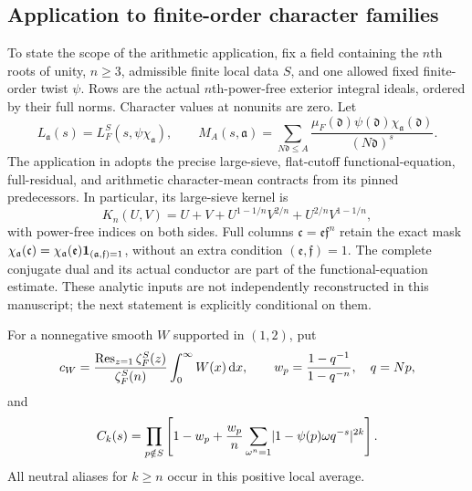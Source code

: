 \subsection{Application to finite-order character families}
To state the scope of the arithmetic application, fix a field containing the $n$th roots of unity, $n\ge3$, admissible finite local data $S$, and one allowed fixed finite-order twist $\psi$. Rows are the actual $n$th-power-free exterior integral ideals, ordered by their full norms. Character values at nonunits are zero. Let
\[
 L_{\mathfrak a}(s)=L_F^S(s,\psi\chi_{\mathfrak a}),\qquad
 M_A(s,\mathfrak a)=\sum_{N\mathfrak d\le A}
 \frac{\mu_F(\mathfrak d)\psi(\mathfrak d)\chi_{\mathfrak a}(\mathfrak d)}{(N\mathfrak d)^s}.
\]
The application in \cite{R989} adopts the precise large-sieve, flat-cutoff functional-equation, full-residual, and arithmetic character-mean contracts from its pinned predecessors. In particular, its large-sieve kernel is
\begin{equation}\label{eq:n-sieve-contract}
 K_n(U,V)=U+V+U^{1-1/n}V^{2/n}+U^{2/n}V^{1-1/n},
\end{equation}
with power-free indices on both sides. Full columns $\mathfrak c=\mathfrak e\mathfrak f^n$ retain the exact mask
$\chi_{\mathfrak a}(\mathfrak c)=\chi_{\mathfrak a}(\mathfrak e)\mathbf 1_{(\mathfrak a,\mathfrak f)=1}$, without an extra condition $(\mathfrak e,\mathfrak f)=1$. The complete conjugate dual and its actual conductor are part of the functional-equation estimate. These analytic inputs are not independently reconstructed in this manuscript; the next statement is explicitly conditional on them.

For a nonnegative smooth $W$ supported in $(1,2)$, put
\[
 c_W=\frac{\operatorname{Res}_{z=1}\zeta_F^S(z)}{\zeta_F^S(n)}\int_0^\infty W(x)\,\mathrm d x,
 \qquad w_p=\frac{1-q^{-1}}{1-q^{-n}},\quad q=Np,
\]
and
\begin{equation}\label{eq:reciprocal-constant}
 C_k(s)=\prod_{p\notin S}\left[
 1-w_p+\frac{w_p}{n}\sum_{\omega^n=1}
               \lvert1-\psi(p)\omega q^{-s}\rvert^{2k}\right].
\end{equation}
All neutral aliases for $k\ge n$ occur in this positive local average.

